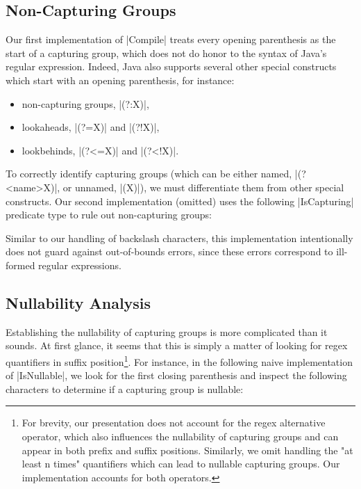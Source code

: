 \subsection{Non-Capturing Groups}

Our first implementation of |Compile| treats every opening parenthesis as the start of a capturing group, which does not do honor to the syntax of Java's regular expression.
Indeed, Java also supports several other special constructs which start with an opening parenthesis, for instance:

\begin{itemize}
  \item non-capturing groups, |(?:X)|,
  \item lookaheads, |(?=X)| and |(?!X)|,
  \item lookbehinds, |(?<=X)| and |(?<!X)|.
\end{itemize}

\noindent
To correctly identify capturing groups (which can be either named, |(?<name>X)|, or unnamed, |(X)|), we must differentiate them from other special constructs.
Our second implementation (omitted) uses the following |IsCapturing| predicate type to rule out non-capturing groups:

\regexIsCapturing

\noindent
Similar to our handling of backslash characters, this implementation intentionally does not guard against out-of-bounds errors, since these errors correspond to ill-formed regular expressions.

\subsection{Nullability Analysis}

Establishing the nullability of capturing groups is more complicated than it sounds.
At first glance, it seems that this is simply a matter of looking for regex quantifiers in suffix position\footnote{
For brevity, our presentation does not account for the regex alternative operator, which also influences the nullability of capturing groups and can appear in both prefix and suffix positions.
Similarly, we omit handling the "at least n times" quantifiers which can lead to nullable capturing groups.
Our implementation accounts for both operators.
}.
For instance, in the following naive implementation of |IsNullable|, we look for the first closing parenthesis and inspect the following characters to determine if a capturing group is nullable:

